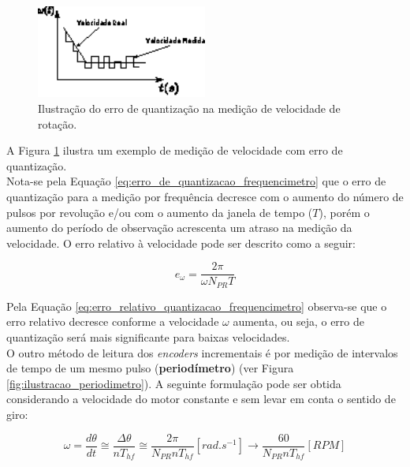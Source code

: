 \begin{figure}[H]
    \centering
    \includegraphics[width=0.5\textwidth]{figuras/ilustracoes/ilustracao_erro_de_quantizacao.eps}
    \caption{Ilustração do erro de quantização na medição de velocidade de rotação.}
    \label{fig:ilustracao_erro_quantizacao}
\end{figure}

A Figura \ref{fig:ilustracao_erro_quantizacao} ilustra um exemplo de medição de velocidade com erro de quantização.\\

Nota-se pela Equação \ref{eq:erro_de_quantizacao_frequencimetro} que o erro de quantização para a medição por frequência decresce com o aumento do número de pulsos por revolução e/ou com o aumento da janela de tempo ($T$), porém o aumento do período de observação acrescenta um atraso na medição da velocidade. O erro relativo à velocidade pode ser descrito como a seguir:

\begin{equation}
    e_{\omega} = \frac{2\pi}{\omega N_{PR} T}
    \label{eq:erro_relativo_quantizacao_frequencimetro}
\end{equation}

Pela Equação \ref{eq:erro_relativo_quantizacao_frequencimetro} observa-se que o erro relativo decresce conforme a velocidade $\omega$ aumenta, ou seja, o erro de quantização será mais significante para baixas velocidades.\\

O outro método de leitura dos \emph{encoders} incrementais é por medição de intervalos de tempo de um mesmo pulso (\textbf{periodímetro}) (ver Figura \ref{fig:ilustracao_periodimetro}). A seguinte formulação pode ser obtida considerando a velocidade do motor constante e sem levar em conta o sentido de giro:

\begin{equation}
    \omega = \frac{d\theta}{dt} \cong \frac{\Delta{\theta}}{nT_{hf}} \cong \frac{2\pi}{N_{PR} n T_{hf}} [rad.s^{-1}] \xrightarrow{} \frac{60}{N_{PR} n T_{hf}} [RPM]
    \label{eq:omega_periodimetro}
\end{equation}

